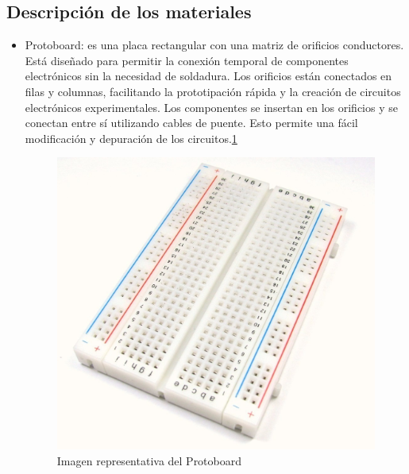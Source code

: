     \subsection{Descripción de los materiales}
    
    \begin{itemize}
        \item Protoboard: es una placa rectangular con una matriz de orificios conductores. Está diseñado para permitir la conexión temporal de componentes electrónicos sin la necesidad de soldadura. Los orificios están conectados en filas y columnas, facilitando la prototipación rápida y la creación de circuitos electrónicos experimentales. Los componentes se insertan en los orificios y se conectan entre sí utilizando cables de puente. Esto permite una fácil modificación y depuración de los circuitos.\ref{fig:protoboard}
    
          \begin{figure}[H]
            \centering
            \includegraphics[trim = {0mm 0mm 0mm 0mm},clip,scale=0.2]{12/Img/protoboard.jpg}
            \caption{Imagen representativa del Protoboard}
            \label{fig:protoboard}
        \end{figure}
        
    \end{itemize}
    
